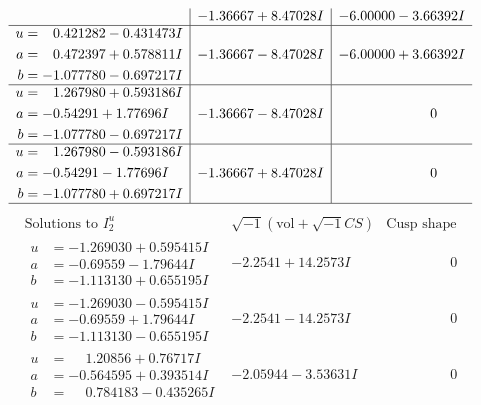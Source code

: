 \documentclass[1p]{elsarticle_modified}
\theoremstyle{definition}
\newcommand{\I}{\sqrt{-1}}
\begin{document}
$$\begin{array}{c|c|c}
 & -1.36667 + 8.47028 I & -6.00000 - 3.66392 I \\ \hline\begin{aligned}
u &= \phantom{-}0.421282 - 0.431473 I \\
a &= \phantom{-}0.472397 + 0.578811 I \\
b &= -1.077780 - 0.697217 I\end{aligned}
 & -1.36667 - 8.47028 I & -6.00000 + 3.66392 I \\ \hline\begin{aligned}
u &= \phantom{-}1.267980 + 0.593186 I \\
a &= -0.54291 + 1.77696 I \\
b &= -1.077780 - 0.697217 I\end{aligned}
 & -1.36667 - 8.47028 I & \phantom{-0.000000 } 0 \\ \hline\begin{aligned}
u &= \phantom{-}1.267980 - 0.593186 I \\
a &= -0.54291 - 1.77696 I \\
b &= -1.077780 + 0.697217 I\end{aligned}
 & -1.36667 + 8.47028 I & \phantom{-0.000000 } 0\\
 \hline 
 \end{array}$$\newpage$$\begin{array}{c|c|c}  
\text{Solutions to }I^u_{2}& \I (\text{vol} + \sqrt{-1}CS) & \text{Cusp shape}\\
 \hline 
\begin{aligned}
u &= -1.269030 + 0.595415 I \\
a &= -0.69559 - 1.79644 I \\
b &= -1.113130 + 0.655195 I\end{aligned}
 & -2.2541 + 14.2573 I & \phantom{-0.000000 } 0 \\ \hline\begin{aligned}
u &= -1.269030 - 0.595415 I \\
a &= -0.69559 + 1.79644 I \\
b &= -1.113130 - 0.655195 I\end{aligned}
 & -2.2541 - 14.2573 I & \phantom{-0.000000 } 0 \\ \hline\begin{aligned}
u &= \phantom{-}1.20856 + 0.76717 I \\
a &= -0.564595 + 0.393514 I \\
b &= \phantom{-}0.784183 - 0.435265 I\end{aligned}
 & -2.05944 - 3.53631 I & \phantom{-0.000000 } 0 \\ \hline\begin{aligned}

\end{aligned}
\end{array}$$
\end{document}
